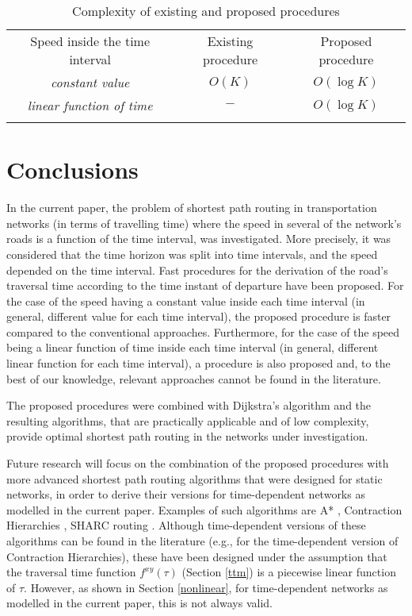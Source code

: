 \documentclass[conference]{IEEEtran}
\begin{document}
\begin{table}
\caption{Complexity of existing and proposed procedures}
\label{contrib}
\begin{footnotesize} 
\begin{center} 
\begin{tabular}{ccc}
\hline\noalign{\smallskip}
 Speed inside the time interval & Existing procedure & Proposed procedure   \\
\noalign{\smallskip}\hline\noalign{\smallskip}
\emph{constant value} & $O(K)$ &  $O(\log K)$  \\
\emph{linear function of time} & $-$ & $O(\log K)$ \\
\noalign{\smallskip}\hline
\end{tabular}
\end{center} 
\end{footnotesize}  
\end{table}

\section{Conclusions}    \label{conclusions}

In the  current paper, the problem of shortest path routing in transportation networks (in terms of travelling time) where the speed in several of the network's roads is a function of the time interval, was investigated. More precisely, it was considered that the time horizon was split into time intervals, and the speed depended on the time interval. Fast procedures for the derivation of the road's traversal time according to the time instant of departure have been proposed. For the case of the speed having a constant value inside each time interval (in general, different value for each time interval), the proposed procedure is faster compared to the conventional approaches. Furthermore, for the case of the speed being a linear function of time inside each time interval (in general, different linear function for each time interval), a procedure is also proposed and, to the best of our knowledge, relevant approaches cannot be found in the literature.  
 
The proposed procedures were combined with Dijkstra's algorithm and the resulting algorithms, that are practically applicable and of low complexity, provide optimal shortest path routing in the networks under investigation.

Future research will focus on the combination of the proposed procedures with more advanced shortest path routing algorithms that were designed for static networks, in order to derive their versions for time-dependent networks as modelled in the current paper. Examples of such algorithms are A* \cite{astar}, Contraction Hierarchies \cite{ch}, SHARC routing \cite{sharc}. Although time-dependent versions of these algorithms can be found in the literature (e.g., \cite{Batz} for the time-dependent version of Contraction Hierarchies), these have been designed under the assumption that the traversal time function $f^{xy}(\tau)$ (Section \ref{ttm}) is a  piecewise linear function of $\tau$. However, as shown in Section \ref{nonlinear}, for time-dependent networks as modelled in the current paper, this is not always valid. 
\end{document}
